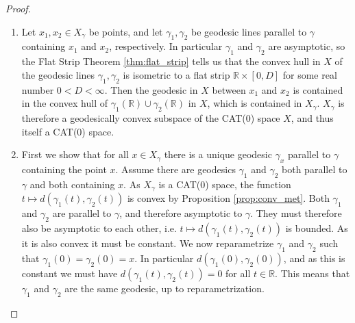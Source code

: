 \documentclass[11pt, a4paper, oneside]{memoir}
\theoremstyle{plain}\newtheorem{theorem}[subsection]{Theorem}
\theoremstyle{definition}
\newcommand{\parenum}{\setenumerate[1]{label=\textbf{(\arabic*)}}}
\newcommand{\R}{\mathbb{R}}
\begin{document}
\begin{proof}
\parenum
\begin{enumerate}
\item Let \(x_1,x_2\in X_\gamma\) be points, and let \(\gamma_1,\gamma_2\) be geodesic lines parallel to \(\gamma\) containing \(x_1\) and \(x_2\), respectively.
In particular \(\gamma_1\) and \(\gamma_2\) are asymptotic, so the Flat Strip Theorem \ref{thm:flat_strip} tells us that the convex hull in \(X\) of the geodesic lines \(\gamma_1,\gamma_2\) is isometric to a flat strip \(\R\times [0,D]\) for some real number \(0<D<\infty\).
Then the geodesic in \(X\) between \(x_1\) and \(x_2\) is contained in the convex hull of \(\gamma_1(\R)\cup\gamma_2(\R)\) in \(X\), which is contained in \(X_\gamma\).
\(X_\gamma\) is therefore a geodesically convex subspace of the CAT(0) space \(X\), and thus itself a CAT(0) space.

\item First we show that for all \(x\in X_\gamma\) there is a unique geodesic \(\gamma_x\) parallel to \(\gamma\) containing the point \(x\).
Assume there are geodesics \(\gamma_1\) and \(\gamma_2\) both parallel to \(\gamma\) and both containing \(x\).
As \(X_\gamma\) is a CAT(0) space, the function \(t\mapsto d(\gamma_1(t),\gamma_2(t))\) is convex by Proposition \ref{prop:conv_met}.
Both \(\gamma_1\) and \(\gamma_2\) are parallel to \(\gamma\), and therefore asymptotic to \(\gamma\).
They must therefore also be asymptotic to each other, i.e. \(t\mapsto d(\gamma_1(t),\gamma_2(t))\) is bounded.
As it is also convex it must be constant.
We now reparametrize \(\gamma_1\) and \(\gamma_2\) such that \(\gamma_1(0)=\gamma_2(0)=x\).
In particular \(d(\gamma_1(0),\gamma_2(0))\), and as this is constant we must have \(d(\gamma_1(t),\gamma_2(t))=0\) for all \(t\in\R\).
This means that \(\gamma_1\) and \(\gamma_2\) are the same geodesic, up to reparametrization.


\end{enumerate}
\end{proof}
\end{document}
